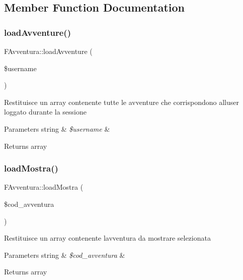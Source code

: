 \subsection{Member Function Documentation}
\mbox{\label{class_f_avventura_a11b7c09eb9588c5aa5b3fb9c7a69855a}} 
\subsubsection{\texorpdfstring{load\+Avventure()}{loadAvventure()}}
{\footnotesize\ttfamily F\+Avventura\+::load\+Avventure (\begin{DoxyParamCaption}\item[{}]{\$username }\end{DoxyParamCaption})}

Restituisce un array contenente tutte le avventure che corrispondono all\textquotesingle{}user loggato durante la sessione


\begin{DoxyParams}[1]{Parameters}
string & {\em \$username} & \\
\hline
\end{DoxyParams}
\begin{DoxyReturn}{Returns}
array 
\end{DoxyReturn}
\mbox{\label{class_f_avventura_aa73d72dc5bb5840a03b850e208ad4568}} 
\subsubsection{\texorpdfstring{load\+Mostra()}{loadMostra()}}
{\footnotesize\ttfamily F\+Avventura\+::load\+Mostra (\begin{DoxyParamCaption}\item[{}]{\$cod\+\_\+avventura }\end{DoxyParamCaption})}

Restituisce un array contenente l\textquotesingle{}avventura da mostrare selezionata


\begin{DoxyParams}[1]{Parameters}
string & {\em \$cod\+\_\+avventura} & \\
\hline
\end{DoxyParams}
\begin{DoxyReturn}{Returns}
array 
\end{DoxyReturn}
\mbox{\label{class_f_avventura_a12a0c627090bf099850b89ab6b515e3a}} 
